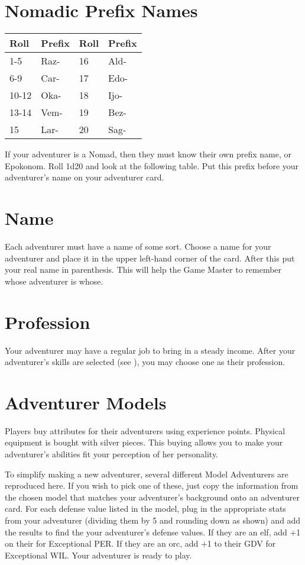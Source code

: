 \section{Nomadic Prefix Names}


\begin{normbox}
\small
\begin{tabular}{l l|l l}
Roll & Prefix & Roll & Prefix\\
\midrule
1-5 & Raz- & 16 & Ald-\\
6-9 & Car- & 17 & Edo-\\
10-12 & Oka- & 18 & Ijo-\\
13-14 & Vem- & 19 & Bez-\\
15 & Lar- & 20 & Sag-\\
\end{tabular}
\normalsize
\end{normbox}
If your adventurer is a Nomad, then they must know their own prefix name, or Epokonom. Roll 1d20 and look at the following table. Put this prefix before your adventurer's name on your adventurer card.

\section{Name}
Each adventurer must have a name of some sort. Choose a name for your adventurer and place it in the upper left-hand corner of the card. After this put your real name in parenthesis. This will help the Game Master to remember whose adventurer is whose.
\section{Profession}
Your adventurer may have a regular job to bring in a steady income. After your adventurer's skills are selected (see ), you may choose one as their profession.
\pagebreak
\section{Adventurer Models}
Players buy attributes for their adventurers using experience points. Physical equipment is bought with silver pieces. This buying allows you to make your adventurer's abilities fit your perception of her personality.

To simplify making a new adventurer, several different Model Adventurers are reproduced here. If you wish to pick one of these, just copy the information from the chosen model that matches your adventurer's background onto an adventurer card. For each defense value listed in the model, plug in the appropriate stats from your adventurer (dividing them by 5 and rounding down as shown) and add the results to find the your adventurer's defense values. If they are an elf, add +1 on their \DV for Exceptional PER. If they are an orc, add +1 to their GDV for Exceptional WIL. Your adventurer is ready to play.

